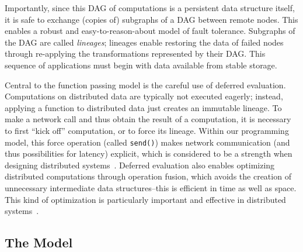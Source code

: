 \documentclass[preprint]{sigplanconf}
\theoremstyle{definition}
\theoremstyle{definition}
\begin{document}
Importantly, since this DAG of computations is a persistent data structure
itself, it is safe to exchange (copies of) subgraphs of a DAG between remote
nodes. This enables a robust and easy-to-reason-about model of fault tolerance.
Subgraphs of the DAG are called \textit{lineages}; lineages enable restoring the data
of failed nodes through re-applying the transformations represented by their
DAG. This sequence of applications must begin with data available from 
stable storage.

Central to the function passing model is the careful use of deferred evaluation.
Computations on distributed data are typically not executed eagerly; instead,
applying a function to distributed data just creates an immutable  
lineage. To make a network  call and thus obtain the result of a 
computation, it is necessary to first ``kick off'' computation, or to force 
 its lineage. Within our programming model, this force 
operation (called \verb|send()|) makes network communication (and thus 
possibilities for latency) explicit, which is considered to be a strength when 
designing distributed systems~\cite{ANoteDistComp}. Deferred evaluation also 
enables optimizing distributed computations through operation fusion, which 
avoids the creation of unnecessary intermediate data structures--this is 
efficient in time as well as space. This kind of optimization is particularly 
important and effective in distributed systems~\cite{FlumeJava}.


\subsection{The Model}
\end{document}
